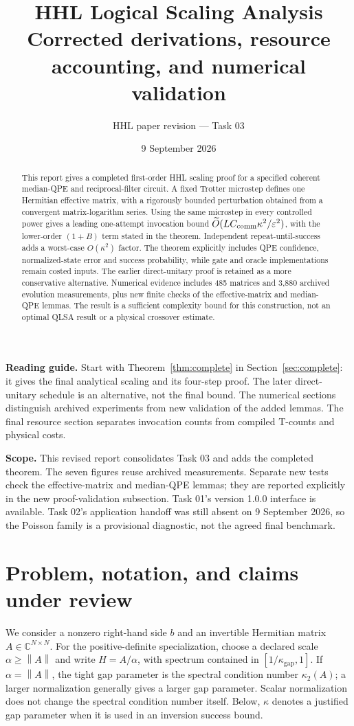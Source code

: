 \documentclass[11pt,a4paper]{article}
\title{HHL Logical Scaling Analysis\\[5pt]\large Corrected derivations, resource accounting, and numerical validation}
\author{HHL paper revision --- Task 03}
\date{9 September 2026}
\newcommand{\norm}[1]{\left\lVert #1\right\rVert}
\begin{document}
\maketitle
\begin{abstract}
This report gives a completed first-order HHL scaling proof for a specified coherent median-QPE and reciprocal-filter circuit. A fixed Trotter microstep defines one Hermitian effective matrix, with a rigorously bounded perturbation obtained from a convergent matrix-logarithm series. Using the same microstep in every controlled power gives a leading one-attempt invocation bound $\widetilde O(L C_{\rm comm}\kappa^2/\varepsilon^2)$, with the lower-order $(1+B)$ term stated in the theorem. Independent repeat-until-success adds a worst-case $O(\kappa^2)$ factor. The theorem explicitly includes QPE confidence, normalized-state error and success probability, while gate and oracle implementations remain costed inputs. The earlier direct-unitary proof is retained as a more conservative alternative. Numerical evidence includes 485 matrices and 3,880 archived evolution measurements, plus new finite checks of the effective-matrix and median-QPE lemmas. The result is a sufficient complexity bound for this construction, not an optimal QLSA result or a physical crossover estimate.
\end{abstract}
\vspace{8pt}
\textbf{Reading guide.} Start with Theorem~\ref{thm:complete} in Section~\ref{sec:complete}: it gives the final analytical scaling and its four-step proof. The later direct-unitary schedule is an alternative, not the final bound. The numerical sections distinguish archived experiments from new validation of the added lemmas. The final resource section separates invocation counts from compiled T-counts and physical costs.

\textbf{Scope.} This revised report consolidates Task 03 and adds the completed theorem. The seven figures reuse archived measurements. Separate new tests check the effective-matrix and median-QPE lemmas; they are reported explicitly in the new proof-validation subsection. Task 01's version 1.0.0 interface is available. Task 02's application handoff was still absent on 9 September 2026, so the Poisson family is a provisional diagnostic, not the agreed final benchmark.
\newpage
\setcounter{tocdepth}{1}
\tableofcontents
\newpage

\section{Problem, notation, and claims under review}
We consider a nonzero right-hand side $b$ and an invertible Hermitian matrix $A\in\mathbb C^{N\times N}$. For the positive-definite specialization, choose a declared scale $\alpha\geq\norm A$ and write $H=A/\alpha$, with spectrum contained in $[1/\kappa_{\mathrm{gap}},1]$. If $\alpha=\norm A$, the tight gap parameter is the spectral condition number $\kappa_2(A)$; a larger normalization generally gives a larger gap parameter. Scalar normalization does not change the spectral condition number itself. Below, $\kappa$ denotes a justified gap parameter when it is used in an inversion success bound.
\end{document}
